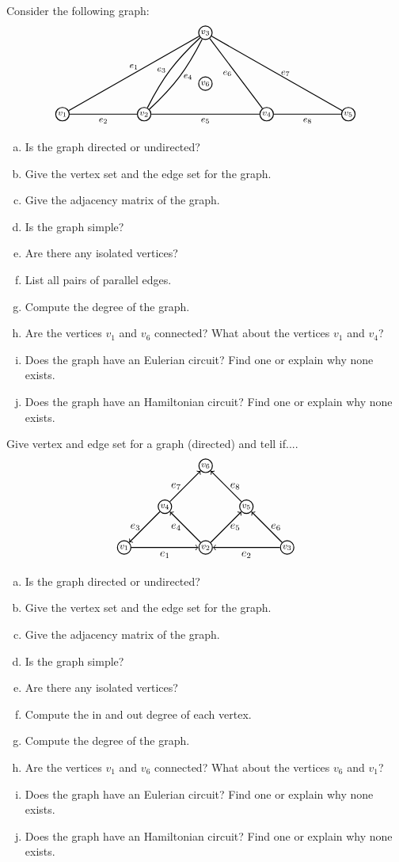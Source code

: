 \documentclass[11pt,letterpaper]{article}
\begin{document}
\homework{}

 Consider the following graph:
	\[
	\graphOne
	\]

\begin{enumerate}[(a)]
\item Is the graph directed or undirected?
\item Give the vertex set and the edge set for the graph.
\item Give the adjacency matrix of the graph.
\item Is the graph simple?
\item Are there any isolated vertices?
\item List all pairs of parallel edges.
\item Compute the degree of the graph.  
\item Are the vertices $v_1$ and $v_6$ connected? What about the vertices $v_1$ and $v_4$? 
\item Does the graph have an Eulerian circuit? Find one or explain why none exists.  
\item Does the graph have an Hamiltonian circuit? Find one or explain why none exists.  
\end{enumerate} \pspace





\newpage





 Give vertex and edge set for a graph (directed) and tell if....
	\[
	\graphTwo
	\]

\begin{enumerate}[(a)]
\item Is the graph directed or undirected?
\item Give the vertex set and the edge set for the graph.
\item Give the adjacency matrix of the graph.
\item Is the graph simple?
\item Are there any isolated vertices?
\item Compute the in and out degree of each vertex. 
\item Compute the degree of the graph.
\item Are the vertices $v_1$ and $v_6$ connected? What about the vertices $v_6$ and $v_1$? 
\item Does the graph have an Eulerian circuit? Find one or explain why none exists.  
\item Does the graph have an Hamiltonian circuit? Find one or explain why none exists.  
\end{enumerate} \pspace
\end{document}

